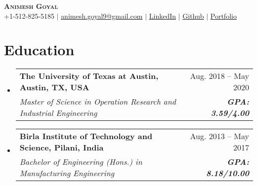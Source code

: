 \documentclass[letterpaper,12pt, margin=2in]{article}
\makeatletter
\newcommand{\resumeSubheading}[4]{
  \vspace{-2pt}\item
    \begin{tabular*}{0.97\textwidth}[t]{l@{\extracolsep{\fill}}r}
      \textbf{#1} & #2 \\
      \textit{\small#3} & \textit{\small #4} \\
    \end{tabular*}\vspace{-8pt}
}
\newcommand{\resumeSubHeadingListStart}{\begin{itemize}[leftmargin=0.05in, label={}]}
\newcommand{\resumeSubHeadingListEnd}{\end{itemize}}
\makeatother
\begin{document}

\begin{center}
    \textbf{\Huge \scshape Animesh Goyal} \\ \vspace{1pt}
    \small +1-512-825-5185 $|$ \href{mailto:animesh.goyal9@gmail.com}{{animesh.goyal9@gmail.com}} $|$ 
    \href{https://www.linkedin.com/in/animesh-goyal-b33080101/}{\underline{LinkedIn}} $|$
    \href{https://github.com/animeshgoyal9}{\underline{Github}} $|$
    \href{https://sites.google.com/view/animeshgoyal9/home}{\underline{Portfolio}}
    
\end{center}

\section{Education}
  \resumeSubHeadingListStart
    \resumeSubheading
      {The University of Texas at Austin, Austin, TX, USA}{Aug. 2018 -- May 2020}
      {Master of Science in Operation Research and Industrial Engineering}{\textbf{GPA: 3.59/4.00}}
    \resumeSubheading
      {Birla Institute of Technology and Science, Pilani, India}{Aug. 2013 -- May 2017}
      {Bachelor of Engineering (Hons.) in Manufacturing Engineering}{\textbf{GPA: 8.18/10.00}}
  \resumeSubHeadingListEnd

\end{document}
